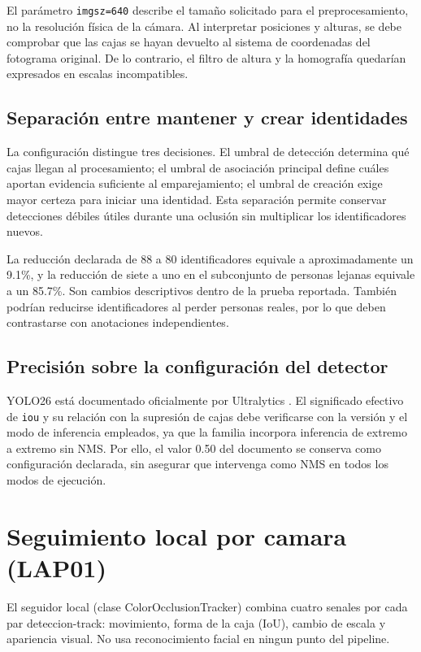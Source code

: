 \documentclass[12pt,letterpaper]{article}
\begin{document}
El parámetro \texttt{imgsz=640} describe el tamaño solicitado para el preprocesamiento, no la resolución física de la cámara. Al interpretar posiciones y alturas, se debe comprobar que las cajas se hayan devuelto al sistema de coordenadas del fotograma original. De lo contrario, el filtro de altura y la homografía quedarían expresados en escalas incompatibles.

\subsection{Separación entre mantener y crear identidades}
La configuración distingue tres decisiones. El umbral de detección determina qué cajas llegan al procesamiento; el umbral de asociación principal define cuáles aportan evidencia suficiente al emparejamiento; el umbral de creación exige mayor certeza para iniciar una identidad. Esta separación permite conservar detecciones débiles útiles durante una oclusión sin multiplicar los identificadores nuevos.

La reducción declarada de 88 a 80 identificadores equivale a aproximadamente un 9.1\%, y la reducción de siete a uno en el subconjunto de personas lejanas equivale a un 85.7\%. Son cambios descriptivos dentro de la prueba reportada. También podrían reducirse identificadores al perder personas reales, por lo que deben contrastarse con anotaciones independientes.

\subsection{Precisión sobre la configuración del detector}
YOLO26 está documentado oficialmente por Ultralytics \cite{yolo26}. El significado efectivo de \texttt{iou} y su relación con la supresión de cajas debe verificarse con la versión y el modo de inferencia empleados, ya que la familia incorpora inferencia de extremo a extremo sin NMS. Por ello, el valor 0.50 del documento se conserva como configuración declarada, sin asegurar que intervenga como NMS en todos los modos de ejecución.

\section{Seguimiento local por camara (LAP01)}

El seguidor local (clase ColorOcclusionTracker) combina cuatro senales por cada par deteccion-track: movimiento, forma de la caja (IoU), cambio de escala y apariencia visual. No usa reconocimiento facial en ningun punto del pipeline.
\end{document}
